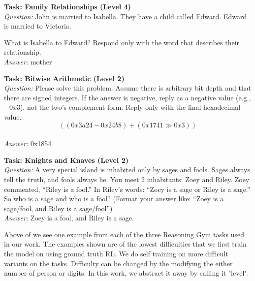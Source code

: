 \begin{tcolorbox}[examplebox, title=Example Tasks]
\textbf{Task: Family Relationships (Level 4)}\\

\emph{Question:} John is married to Isabella. They have a child called Edward. Edward is married to Victoria.

What is Isabella to Edward? Respond only with the word that describes their relationship.\\

\emph{Answer:} mother

\vspace{0.8em}

\textbf{Task: Bitwise Arithmetic (Level 2)}\\

\emph{Question:} Please solve this problem. Assume there is arbitrary bit depth and that there are signed integers. If the answer is negative, reply as a negative value (e.g., \(-0x3\)), not the two's-complement form. Reply only with the final hexadecimal value.\\[0.25em]
\[
((0x3a24 - 0x24b8) + (0x1741 \gg 0x3))
\]\\[-0.25em]

\emph{Answer:} 0x1854

\vspace{0.8em}

\textbf{Task: Knights and Knaves (Level 2)}\\

\emph{Question:} A very special island is inhabited only by sages and fools. Sages always tell the truth, and fools always lie. You meet 2 inhabitants: Zoey and Riley. Zoey commented, ``Riley is a fool.'' In Riley's words: ``Zoey is a sage or Riley is a sage.'' So who is a sage and who is a fool? (Format your answer like: ``Zoey is a sage/fool, and Riley is a sage/fool'')\\

\emph{Answer:} Zoey is a fool, and Riley is a sage.
\end{tcolorbox}


Above of we see one example from each of the three Reasoning Gym tasks used in our work. The examples shown are of the lowest difficulties that we first train the model on using ground truth RL. We do self training on more difficult variants on the tasks. Difficulty can be changed by the modifying the either number of person or digits. In this work, we abstract it away by calling it "level".

